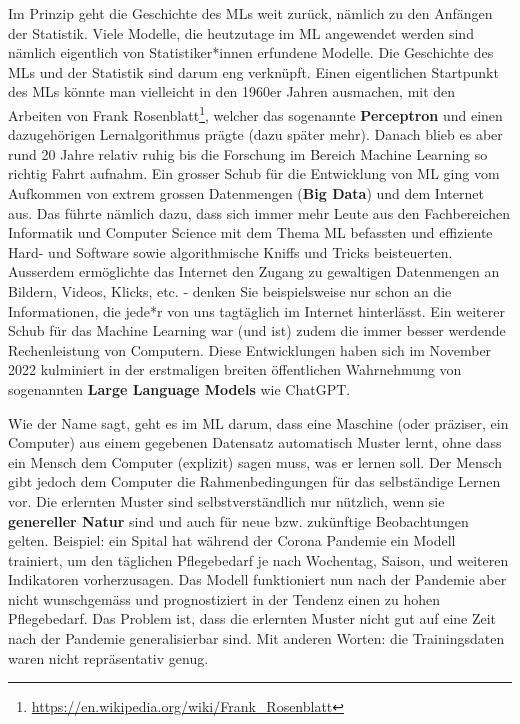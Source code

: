 \documentclass[
]{book}
\begin{document}
Im Prinzip geht die Geschichte des MLs weit zurück, nämlich zu den Anfängen der Statistik. Viele Modelle, die heutzutage im ML angewendet werden sind nämlich eigentlich von Statistiker*innen erfundene Modelle. Die Geschichte des MLs und der Statistik sind darum eng verknüpft. Einen eigentlichen Startpunkt des MLs könnte man vielleicht in den 1960er Jahren ausmachen, mit den Arbeiten von Frank Rosenblatt\footnote{\url{https://en.wikipedia.org/wiki/Frank_Rosenblatt}}, welcher das sogenannte \textbf{Perceptron} und einen dazugehörigen Lernalgorithmus prägte (dazu später mehr). Danach blieb es aber rund 20 Jahre relativ ruhig bis die Forschung im Bereich Machine Learning so richtig Fahrt aufnahm. Ein grosser Schub für die Entwicklung von ML ging vom Aufkommen von extrem grossen Datenmengen (\textbf{Big Data}) und dem Internet aus. Das führte nämlich dazu, dass sich immer mehr Leute aus den Fachbereichen Informatik und Computer Science mit dem Thema ML befassten und effiziente Hard- und Software sowie algorithmische Kniffs und Tricks beisteuerten. Ausserdem ermöglichte das Internet den Zugang zu gewaltigen Datenmengen an Bildern, Videos, Klicks, etc. - denken Sie beispielsweise nur schon an die Informationen, die jede*r von uns tagtäglich im Internet hinterlässt. Ein weiterer Schub für das Machine Learning war (und ist) zudem die immer besser werdende Rechenleistung von Computern. Diese Entwicklungen haben sich im November 2022 kulminiert in der erstmaligen breiten öffentlichen Wahrnehmung von sogenannten \textbf{Large Language Models} wie ChatGPT.

Wie der Name sagt, geht es im ML darum, dass eine Maschine (oder präziser, ein Computer) aus einem gegebenen Datensatz automatisch Muster lernt, ohne dass ein Mensch dem Computer (explizit) sagen muss, was er lernen soll. Der Mensch gibt jedoch dem Computer die Rahmenbedingungen für das selbständige Lernen vor. Die erlernten Muster sind selbstverständlich nur nützlich, wenn sie \textbf{genereller Natur} sind und auch für neue bzw. zukünftige Beobachtungen gelten. Beispiel: ein Spital hat während der Corona Pandemie ein Modell trainiert, um den täglichen Pflegebedarf je nach Wochentag, Saison, und weiteren Indikatoren vorherzusagen. Das Modell funktioniert nun nach der Pandemie aber nicht wunschgemäss und prognostiziert in der Tendenz einen zu hohen Pflegebedarf. Das Problem ist, dass die erlernten Muster nicht gut auf eine Zeit nach der Pandemie generalisierbar sind. Mit anderen Worten: die Trainingsdaten waren nicht repräsentativ genug.
\end{document}
